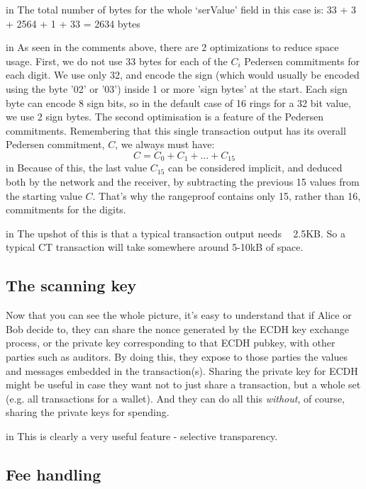 \documentclass[10pt,a4paper]{article}
\begin{document}
 in \noindent The total number of bytes for the whole `serValue' field in this case is: 33 + 3 + 2564 + 1 + 33 = 2634 bytes

 in \noindent As seen in the comments above, there are 2 optimizations to reduce space usage. First, we do not use 33 bytes for each of the $C_{i}$ Pedersen commitments for each digit. We use only 32, and encode the sign (which would usually be encoded using the byte '02' or '03') inside 1 or more 'sign bytes' at the start. Each sign byte can encode 8 sign bits, so in the default case of 16 rings for a 32 bit value, we use 2 sign bytes. The second optimisation is a feature of the Pedersen commitments. Remembering that this single transaction output has its overall Pedersen commitment, $C$, we always must have:
\[C = C_{0} + C_{1} + ... + C_{15}\]
 in \noindent Because of this, the last value $C_{15}$ can be considered implicit, and deduced both by the network and the receiver, by subtracting the previous 15 values from the starting value $C$. That's why the rangeproof contains only 15, rather than 16, commitments for the digits.

 in \noindent The upshot of this is that a typical transaction output needs ~ 2.5KB. So a typical CT transaction will take somewhere around 5-10kB of space.

\subsection{The scanning key}

Now that you can see the whole picture, it's easy to understand that if Alice or Bob decide to, they can share the nonce generated by the ECDH key exchange process, or the private key corresponding to that ECDH pubkey, with other parties such as auditors. By doing this, they expose to those parties the values and messages embedded in the transaction(s). Sharing the private key for ECDH might be useful in case they want not to just share a transaction, but a whole set (e.g. all transactions for a wallet). And they can do all this \emph{without}, of course, sharing the private keys for spending.

 in \noindent This is clearly a very useful feature - selective transparency.

\subsection{Fee handling}
\end{document}
